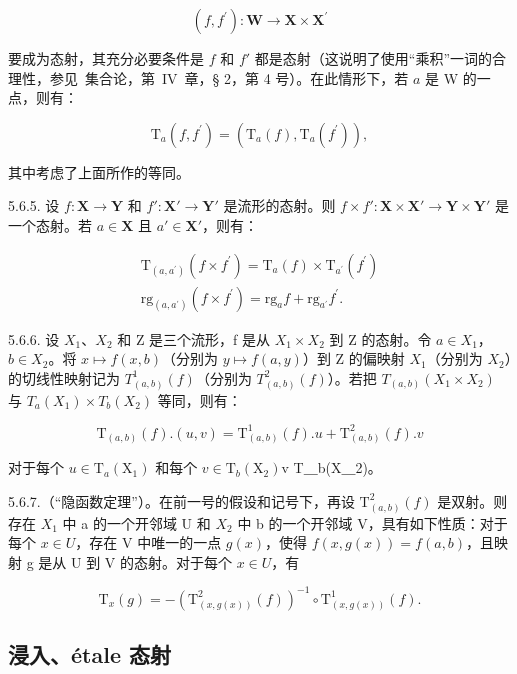 \[
(f, f ^ {\prime}): \mathbf {W} \rightarrow \mathbf {X} \times \mathbf {X} ^ {\prime}
\]

要成为态射，其充分必要条件是 \(f\) 和 \(f'\) 都是态射（这说明了使用“乘积”一词的合理性，参见~集合论，第~IV~章，§ 2，第 4 号）。在此情形下，若 \(a\) 是 W 的一点，则有：

\[
\mathrm{T} _ {a} (f, f ^ {\prime}) = (\mathrm{T} _ {a} (f), \mathrm{T} _ {a} (f ^ {\prime})),
\]

其中考虑了上面所作的等同。

5.6.5. 设 \(f: \mathbf{X} \to \mathbf{Y}\) 和 \(f': \mathbf{X}' \to \mathbf{Y}'\) 是流形的态射。则 \(f \times f': \mathbf{X} \times \mathbf{X}' \to \mathbf{Y} \times \mathbf{Y}'\) 是一个态射。若 \(a \in \mathbf{X}\) 且 \(a' \in \mathbf{X}'\)，则有：

\[
\begin{array}{l} \mathrm{T} _ {(a, a ^ {\prime})} (f \times f ^ {\prime}) = \mathrm{T} _ {a} (f) \times \mathrm{T} _ {a ^ {\prime}} (f ^ {\prime}) \\ \mathrm{rg} _ {(a, a ^ {\prime})} (f \times f ^ {\prime}) = \mathrm{rg} _ {a} f + \mathrm{rg} _ {a ^ {\prime}} f ^ {\prime}. \end{array}
\]

5.6.6. 设 \(X_{1}\)、\(X_{2}\) 和 Z 是三个流形，f 是从 \(X_{1} \times X_{2}\) 到 Z 的态射。令 \(a \in X_{1}\)，\(b \in X_{2}\)。将 \(x \mapsto f(x, b)\)（分别为 \(y \mapsto f(a, y)\)）到 Z 的偏映射 \(X_{1}\)（分别为 \(X_{2}\)）的切线性映射记为 \(T_{(a,b)}^{1}(f)\)（分别为 \(T_{(a,b)}^{2}(f)\)）。若把 \(T_{(a,b)}(X_{1} \times X_{2})\) 与 \(T_{a}(X_{1}) \times T_{b}(X_{2})\) 等同，则有：

\[
\mathrm{T} _ {(a, b)} (f). (u, v) = \mathrm{T} _ {(a, b)} ^ {1} (f). u + \mathrm{T} _ {(a, b)} ^ {2} (f). v
\]

对于每个 \(u \in \mathrm{T}_a(\mathrm{X}_1)\) 和每个 \(v \in \mathrm{T}_b(\mathrm{X}_2)\)v  T＿b(X＿2)。

5.6.7.（“隐函数定理”）。在前一号的假设和记号下，再设 \(\mathrm{T}_{(a,b)}^{2}(f)\) 是双射。则存在 \(X_{1}\) 中 a 的一个开邻域 U 和 \(X_{2}\) 中 b 的一个开邻域 V，具有如下性质：对于每个 \(x \in U\)，存在 V 中唯一的一点 \(g(x)\)，使得 \(f(x, g(x)) = f(a, b)\)，且映射 g 是从 U 到 V 的态射。对于每个 \(x \in U\)，有

\[
\mathrm{T} _ {x} (g) = - \left(\mathrm{T} _ {(x, g (x))} ^ {2} (f)\right) ^ {- 1} \circ \mathrm{T} _ {(x, g (x))} ^ {1} (f).
\]

\subsection{浸入、étale 态射}


